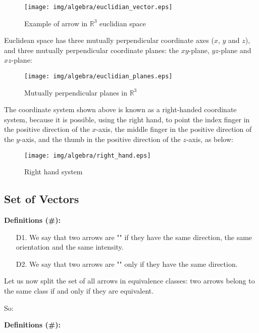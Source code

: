 \begin{figure}[H]
\centering
\texttt{[image: img/algebra/euclidian\_vector.eps]}
\caption{Example of arrow in $\mathbb{R}^3$ euclidian space}
\end{figure}

Euclidean space has three mutually perpendicular coordinate axes ($x$, $y$ and $z$), and three mutually perpendicular coordinate planes: the $xy$-plane, $yz$-plane and $xz$-plane:

\begin{figure}[H]
\centering
\texttt{[image: img/algebra/euclidian\_planes.eps]}
\caption{Mutually perpendicular planes in $\mathbb{R}^3$}
\end{figure}

The coordinate system shown above is known as a right-handed coordinate system, because it is possible, using the right hand, to point the index finger in the positive direction of the $x$-axis, the middle finger in the positive direction of the $y$-axis, and the thumb in the positive direction of the $z$-axis, as below:

\begin{figure}[H]
\centering
\texttt{[image: img/algebra/right\_hand.eps]}
\caption{Right hand system}
\end{figure}


	\subsection{Set of Vectors}	

\textbf{Definitions (\#\mydef):}

	\begin{enumerate}
		\item[D1.] We say that two arrows are ""   if they have the same direction, the same orientation and the same intensity.
		\item[D2.] We say that two arrows are "" only if they have the same direction.
	\end{enumerate}
Let us now split the set of all arrows in equivalence classes: two arrows belong to the same class if and only if they are equivalent.

So:

\textbf{Definitions (\#\mydef):} 

